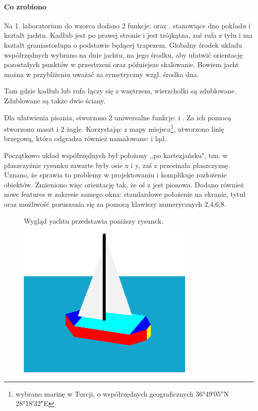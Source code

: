 \paragraph{Co zrobiono} Na 1. laboratorium do wzorca dodano 2 funkcje:  oraz , stanowiące dno pokładu i kształt jachtu. Kadłub jest po prawej stronie i jest trójkątna, zaś rufa z tyłu i ma kształt graniastosłupa o podstawie będącej trapezem. 
Globalny środek układu współrzędnych wybrano na dnie jachtu, na jego środku, aby ułatwić orientację pozostałych punktów w przestrzeni oraz późniejsze skalowanie. Bowiem jacht można w przybliżeniu uważać za symetryczny wzgl. środka dna.

Tam gdzie kadłub lub rufa łączy się z wnętrzem, wierzchołki są zdublowane. Zdublowane są także dwie ściany.

Dla ułatwienia pisania, stworzono 2 uniwersalne funkcje:  i . Za ich pomocą stworzono maszt i 2 żagle. Korzystając z mapy miejsca\footnote{wybrano marinę w Turcji, o współrzędnych geograficznych  \ang{36;49;05}N \ang{28;18;32}E}, utworzono linię brzegową, która odgradza również namalowane:  i ląd. 

Początkowo układ współrzędnych był położony ,,po kartezjańsku", tzn. w płaszczyźnie rysunku zawarte były osie x i y, zaś z przecinała płaszczyznę. Uznano, że sprawia to problemy w projektowaniu i komplikuje rozłożenie obiektów. Zmieniono więc orientację tak, że oś z jest pionowa. Dodano również nowe features w zakresie samego okna: standardowe położenie na ekranie, tytuł oraz możliwość poruszania się za pomocą klawiszy numerycznych 2,4,6,8.

\begin{figure}[b]
	Wygląd yachtu przedstawia poniższy rysunek.
	\includegraphics{img/firstBoat}
\end{figure}

